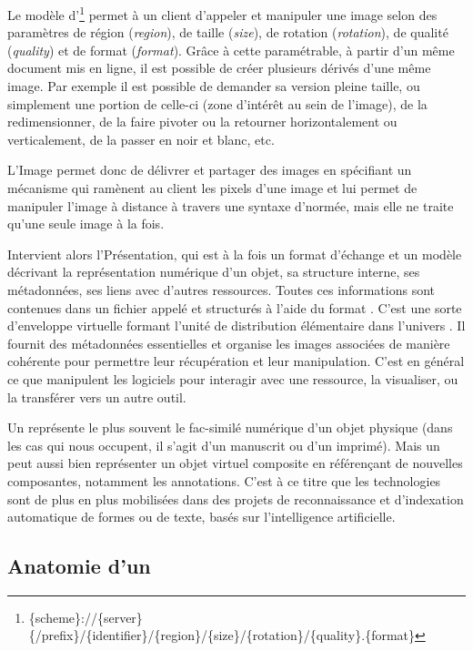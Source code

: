 Le modèle d'\URL\footnote{\{scheme\}://\{server\}\{/prefix\}/\{identifier\}/\{region\}/\{size\}/\{rotation\}/\{quality\}.\{format\}}
permet à un client d'appeler et manipuler une image selon des paramètres
de région (\textit{region}), de taille (\textit{size}), de rotation (\textit{rotation}), de qualité
(\textit{quality}) et de format (\textit{format}). Grâce à cette \URL paramétrable, à partir
d'un même document mis en ligne, il est possible de créer plusieurs
dérivés d'une même image. Par exemple il est possible de demander sa
version pleine taille, ou simplement une portion de celle-ci
(zone d'intérêt au sein de l'image), de la redimensionner, de la faire
pivoter ou la retourner horizontalement ou verticalement, de la passer
en noir et blanc, etc.

L'\api Image permet donc de délivrer et partager des images en spécifiant
un mécanisme qui ramènent au client les pixels d'une image et lui permet
de manipuler l'image à distance à travers une syntaxe d'\URL normée, mais
elle ne traite qu'une seule image à la fois.

Intervient alors l'\api Présentation, qui est à la fois un format
d'échange et un modèle décrivant la représentation numérique d'un objet,
sa structure interne, ses métadonnées, ses liens avec d'autres
ressources. Toutes ces informations sont contenues dans un fichier
appelé \man et structurés à l'aide du format \json. C'est une
sorte d'enveloppe virtuelle formant l'unité de distribution élémentaire
dans l'univers \iiif. Il fournit des métadonnées essentielles et organise
les images associées de manière cohérente pour permettre leur
récupération et leur manipulation. C'est en général ce que manipulent
les logiciels pour interagir avec une ressource, la visualiser, ou la
transférer vers un autre outil.

Un \man \iiif représente le plus souvent le fac-similé
numérique d'un objet physique (dans les cas qui nous occupent, il s'agit
d'un manuscrit ou d'un imprimé). Mais un \man peut aussi bien
représenter un objet virtuel composite en référençant de nouvelles
composantes, notamment les annotations. C'est à ce titre que les
technologies \iiif sont de plus en plus mobilisées dans des projets de
reconnaissance et d'indexation automatique de formes ou de texte, basés
sur l'intelligence artificielle.

\hypertarget{anatomie-dun-manifest}{%
\subsection{Anatomie d'un
\man}\label{anatomie-dun-manifest}}

